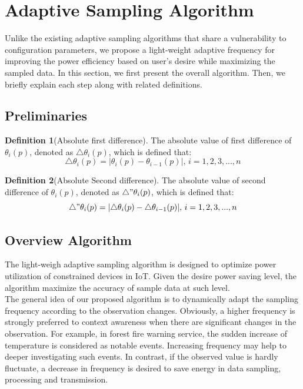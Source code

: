 \section{Adaptive Sampling Algorithm}
Unlike the existing adaptive sampling algorithms that share a vulnerability to configuration parameters, we propose a light-weight adaptive frequency for improving the power efficiency based on user's desire while maximizing the sampled data. In this section, we first present the overall algorithm. Then, we briefly explain each step along with related definitions.

\subsection{Preliminaries}
\textbf{Definition 1}(Absolute first difference). The absolute value of first difference of $ \theta_{i}(p) $, denoted as $ \triangle\theta_i(p) $, which is defined that:
\begin{equation}\label{First_difference}
\triangle\theta_i(p) = |\theta_{i}(p) - \theta_{i-1}(p)|,\, i = 1, 2, 3, ..., n
\end{equation}

\textbf{Definition 2}(Absolute Second difference). The absolute value of second difference of  $ \theta_{i}(p) $, denoted as $ \triangle " \theta_i(p) $, which is defined that:
\begin{equation}\label{Second_difference}
\triangle"\theta_i(p) = |\triangle\theta_{i}(p) - \triangle\theta_{i-1}(p)|,\, i = 1, 2, 3, ..., n
\end{equation}

\subsection{Overview Algorithm}
The light-weigh adaptive sampling algorithm is designed to optimize power utilization of constrained devices in IoT. Given the desire power saving level, the algorithm maximize the accuracy of sample data at such level.  \\

The general idea of our proposed algorithm is to dynamically adapt the sampling frequency according to the observation changes. Obviously, a higher frequency is strongly preferred to context awareness when there are significant changes in the observation. For example, in forest fire warning service, the sudden increase of temperature is considered as notable events. Increasing frequency may help to deeper investigating such events. In contrast, if the observed value is hardly fluctuate, a decrease in frequency is desired to save energy in data sampling, processing and transmission. \\

